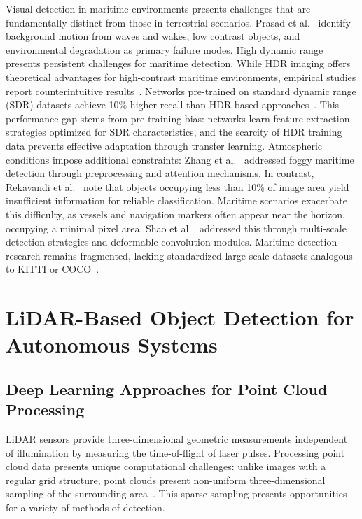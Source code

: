 \documentclass[../main.tex]{subfiles}
\begin{document}
Visual detection in maritime environments presents challenges that are fundamentally distinct from those in terrestrial scenarios.
Prasad et al.~\cite{prasad2017} identify background motion from waves and wakes, low contrast objects, and environmental degradation as primary failure modes.
High dynamic range presents persistent challenges for maritime detection.
While HDR imaging offers theoretical advantages for high-contrast maritime environments, empirical studies report counterintuitive results~\cite{landaeta, liebergall, wang2019a}.
Networks pre-trained on standard dynamic range (SDR) datasets achieve 10\% higher recall than HDR-based approaches~\cite{landaeta, liebergall}.
This performance gap stems from pre-training bias: networks learn feature extraction strategies optimized for SDR characteristics, and the scarcity of HDR training data prevents effective adaptation through transfer learning.
Atmospheric conditions impose additional constraints: Zhang et al.~\cite{zhang2022a} addressed foggy maritime detection through preprocessing and attention mechanisms. In contrast, Rekavandi et al.~\cite{rekavandi2022} note that objects occupying less than 10\% of image area yield insufficient information for reliable classification.
Maritime scenarios exacerbate this difficulty, as vessels and navigation markers often appear near the horizon, occupying a minimal pixel area.
Shao et al.~\cite{shao2022} addressed this through multi-scale detection strategies and deformable convolution modules.
Maritime detection research remains fragmented, lacking standardized large-scale datasets analogous to KITTI or COCO~\cite{zhang2021, yang2024, su2023}.

\section{LiDAR-Based Object Detection for Autonomous Systems}

\subsection{Deep Learning Approaches for Point Cloud Processing}

\acl{LiDAR} sensors provide three-dimensional geometric measurements independent of illumination by measuring the time-of-flight of laser pulses.
Processing point cloud data presents unique computational challenges: unlike images with a regular grid structure, point clouds present non-uniform three-dimensional sampling of the surrounding area~\cite{zhou2018, shi2019}.
This sparse sampling presents opportunities for a variety of methods of detection.
\end{document}
